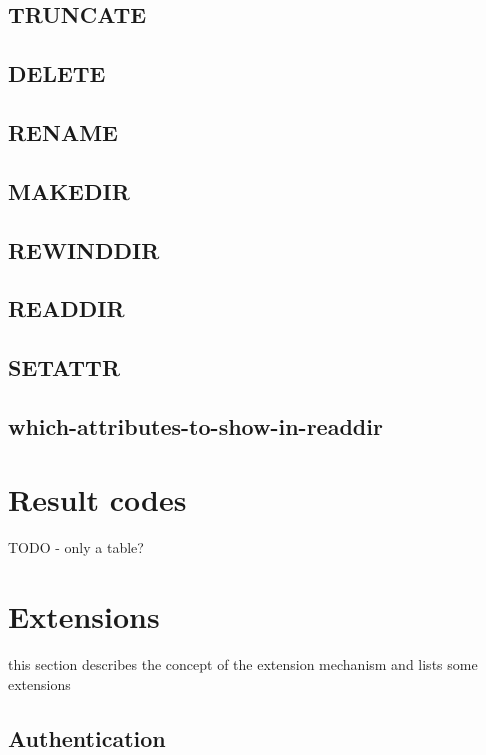 \subsection{TRUNCATE}

\subsection{DELETE}

\subsection{RENAME}

\subsection{MAKEDIR}

\subsection{REWINDDIR}

\subsection{READDIR}

\subsection{SETATTR}

\subsection{which-attributes-to-show-in-readdir}


\section{Result codes}

TODO - only a table?


\section{Extensions}

this section describes the concept of the extension mechanism and lists some extensions

\subsection{Authentication}

